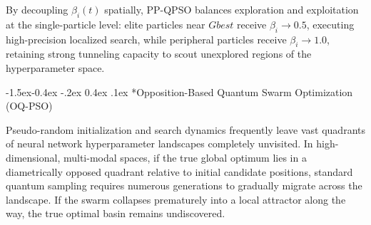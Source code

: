 \documentclass[10pt]{article}
\makeatletter
\renewcommand\subsubsection{\@startsection{subsubsection}{3}{\z@}%
                                     {-1.5ex\@plus -0.4ex \@minus -.2ex}%
                                     {0.4ex \@plus .1ex}%
                                     {\normalfont\itshape\fontsize{7.8pt}{10.0pt}\selectfont}}
\makeatother
\begin{document}
By decoupling $\beta_i(t)$ spatially, PP-QPSO balances exploration and exploitation at the single-particle level: elite particles near $Gbest$ receive $\beta_i \to 0.5$, executing high-precision localized search, while peripheral particles receive $\beta_i \to 1.0$, retaining strong tunneling capacity to scout unexplored regions of the hyperparameter space.



\subsubsection*{Opposition-Based Quantum Swarm Optimization (OQ-PSO)}

Pseudo-random initialization and search dynamics frequently leave vast quadrants of neural network hyperparameter landscapes completely unvisited. In high-dimensional, multi-modal spaces, if the true global optimum lies in a diametrically opposed quadrant relative to initial candidate positions, standard quantum sampling requires numerous generations to gradually migrate across the landscape. If the swarm collapses prematurely into a local attractor along the way, the true optimal basin remains undiscovered.
\end{document}
